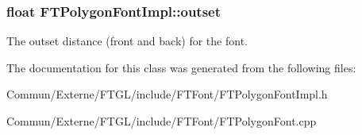 \subsubsection[{\texorpdfstring{outset}{outset}}]{\setlength{\rightskip}{0pt plus 5cm}float F\+T\+Polygon\+Font\+Impl\+::outset\hspace{0.3cm}{\ttfamily [private]}}\hypertarget{class_f_t_polygon_font_impl_a60c09e7962dace23ef2efc6599e1430d}{}\label{class_f_t_polygon_font_impl_a60c09e7962dace23ef2efc6599e1430d}
The outset distance (front and back) for the font. 

The documentation for this class was generated from the following files\+:\begin{DoxyCompactItemize}
\item 
Commun/\+Externe/\+F\+T\+G\+L/include/\+F\+T\+Font/F\+T\+Polygon\+Font\+Impl.\+h\item 
Commun/\+Externe/\+F\+T\+G\+L/include/\+F\+T\+Font/F\+T\+Polygon\+Font.\+cpp\end{DoxyCompactItemize}
